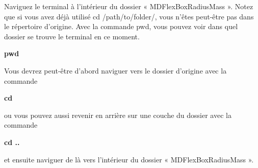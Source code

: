 \documentclass{article}
\begin{document}
Naviguez le terminal à l'intérieur du dossier « MDFlexBoxRadiusMass ». Notez que si vous avez déjà utilisé cd /path/to/folder/, vous n'êtes peut-être pas dans le répertoire d'origine. Avec la commande pwd, vous pouvez voir dans quel dossier se trouve le terminal en ce moment.
\begin{tcolorbox}[width=\textwidth,colframe=Bittersweet,colback={black},title={Ceci est le terminal},outer arc=0mm,colupper=white]  
    \large\textbf{  pwd }
\end{tcolorbox}
Vous devrez peut-être d'abord naviguer vers le dossier d'origine avec la commande
\begin{tcolorbox}[width=\textwidth,colframe=Bittersweet,colback={black},title={Ceci est le terminal},outer arc=0mm,colupper=white]  
    \large\textbf{  cd }
\end{tcolorbox}
ou vous pouvez aussi revenir en arrière sur une couche du dossier avec la commande
\begin{tcolorbox}[width=\textwidth,colframe=Bittersweet,colback={black},title={Ceci est le terminal},outer arc=0mm,colupper=white]  
    \large\textbf{  cd ..}
\end{tcolorbox}
et ensuite naviguer de là vers l'intérieur du dossier « MDFlexBoxRadiusMass ».
\end{document}
